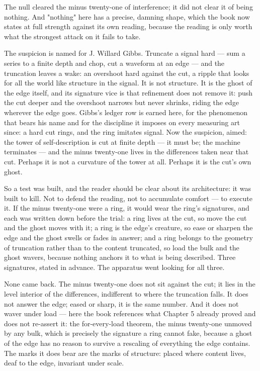The null cleared the minus twenty-one of interference; it did not clear it of being
nothing. And "nothing" here has a precise, damning shape, which the book now states
at full strength against its own reading, because the reading is only worth what the
strongest attack on it fails to take.

The suspicion is named for J. Willard Gibbs. Truncate a signal hard --- sum a series
to a finite depth and chop, cut a waveform at an edge --- and the truncation leaves a
wake: an overshoot hard against the cut, a ripple that looks for all the world like
structure in the signal. It is not structure. It is the ghost of the edge itself, and
its signature vice is that refinement does not remove it: push the cut deeper and the
overshoot narrows but never shrinks, riding the edge wherever the edge goes. Gibbs's
ledger row is earned here, for the phenomenon that bears his name and for the
discipline it imposes on every measuring art since: a hard cut rings, and the ring
imitates signal. Now the suspicion, aimed: the tower of self-description is cut at
finite depth --- it must be; the machine terminates --- and the minus twenty-one
lives in the differences taken near that cut. Perhaps it is not a curvature of the
tower at all. Perhaps it is the cut's own ghost.

So a test was built, and the reader should be clear about its architecture: it was
built to kill. Not to defend the reading, not to accumulate comfort --- to execute
it. If the minus twenty-one were a ring, it would wear the ring's signatures, and
each was written down before the trial: a ring lives at the cut, so move the cut and
the ghost moves with it; a ring is the edge's creature, so ease or sharpen the edge
and the ghost swells or fades in answer; and a ring belongs to the geometry of
truncation rather than to the content truncated, so load the bulk and the ghost
wavers, because nothing anchors it to what is being described. Three signatures,
stated in advance. The apparatus went looking for all three.

None came back. The minus twenty-one does not sit against the cut; it lies in the
level interior of the differences, indifferent to where the truncation falls. It
does not answer the edge; eased or sharp, it is the same number. And it does not
waver under load --- here the book references what Chapter 5 already proved and
does not re-assert it: the for-every-load theorem, the minus twenty-one unmoved by
any bulk, which is precisely the signature a ring cannot fake, because a ghost of
the edge has no reason to survive a rescaling of everything the edge contains. The
marks it does bear are the marks of structure: placed where content lives, deaf to
the edge, invariant under scale.

